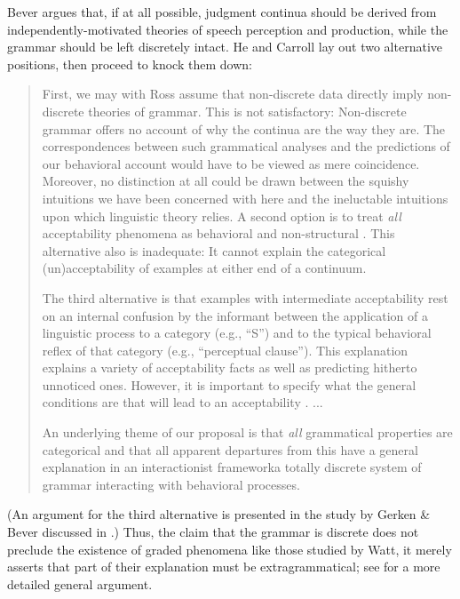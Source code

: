 \noindent
Bever argues that, if at all possible, judgment continua should be derived from independently-motivated theories of speech perception and production, while the grammar should be left discretely intact. He and Carroll lay out two alternative positions, then proceed to knock them down:

\begin{quote}
First, we may with Ross assume that non-discrete data directly imply non-discrete theories of grammar. This is not satisfactory: Non-discrete grammar offers no account of why the continua are the way they are. The correspondences between such grammatical analyses and the predictions of our behavioral account would have to be viewed as mere coincidence. Moreover, no distinction at all could be drawn between the squishy intuitions we have been concerned with here and the ineluctable intuitions upon which linguistic theory relies. A second option is to treat \textit{all} acceptability phenomena as behavioral and non-structural \citep{ClarkEtAl1974}. This alternative also is inadequate: It cannot explain the categorical (un)accepta\-bility of examples at either end of a continuum.



The third alternative is that examples with intermediate acceptability rest on an internal confusion by the informant between the application of a linguistic process to a category (e.g., ``S'') and to the typical behavioral reflex of that category (e.g., ``perceptual clause''). This explanation explains a variety of acceptability facts as well as predicting hitherto unnoticed ones. However, it is important to specify what the general conditions are that will lead to an acceptability . ...

An underlying theme of our proposal is that \textit{all} grammatical properties are categorical and that all apparent departures from this have a general explanation in an interactionist framework\schdash{}a totally discrete system of grammar interacting with behavioral processes.  \citep[232--323]{BeverEtAl1981}
\end{quote}


\noindent
(An argument for the third alternative is presented in the study by Gerken \& Bever discussed in .) Thus, the claim that the grammar is discrete does not preclude the existence of graded phenomena like those studied by Watt, it merely asserts that part of their explanation must be extragrammatical; see \citet{KatzEtAl1976} for a more detailed general argument.

